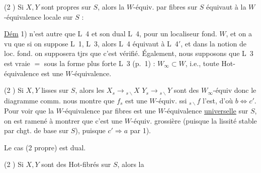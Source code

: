 (2 ) Si $X,Y$ sont propres sur $S$, alors la $W$-équiv. par fibres sur $S$ équivaut à la $W$-équivalence locale sur $S$ :

\uline{Dém} 1) n'est autre que L~4 et  son dual L~4, pour un localiseur fond. $W$, et on a vu que si on suppose L~1, L~3, alors L~4 équivaut à L~4$'$, et dans la notion de loc. fond. on supposera tjrs que c'est vérifié. Également, nous supposons que L~3 est vraie $=$ sous la forme plus forte L~3  (p.~1) : $W_\infty\subset W$, i.e., toute Hot-équivalence est une $W$-équivalence.

(2 ) Si $X,Y$ lisses sur $S$, alors les $X_s\longrightarrow{}_{s\backslash}X$ $Y_s\longrightarrow{}_{s\backslash}Y$ sont des $W_\infty$-équiv  donc le diagramme comm.
nous montre que $f_s$ est une $W$-équiv. ssi $ {}_{s\backslash}f$ l'est, d'où $b\Longleftrightarrow c'$. Pour voir que la $W$-équivalence par fibres est \inserted{$=$} une $W$-équivalence \uline{universelle} sur $S$,  on est ramené à montrer que c'est une $W$-équiv. grossière (puisque  la lissité stable par chgt. de base sur $S$),    puisque $c'\Rightarrow a$ par 1).

Le cas (2 propre) est dual.

(2 ) Si $X,Y$ sont des Hot-fibrés sur $S$, alors la
